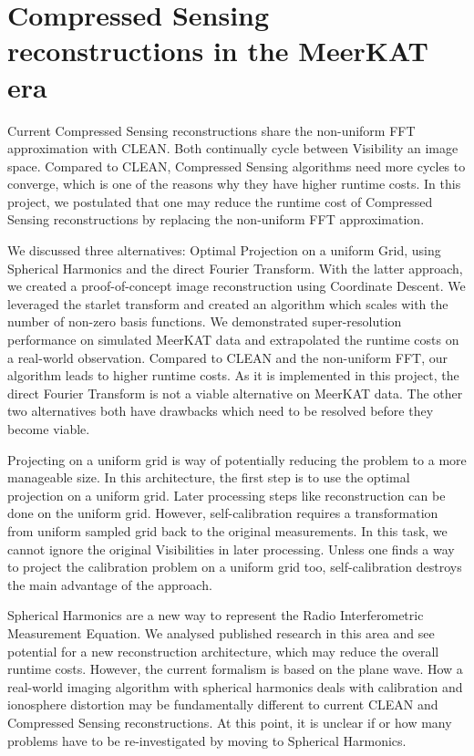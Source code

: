 \section{Compressed Sensing reconstructions in the MeerKAT era}
Current Compressed Sensing reconstructions share the non-uniform FFT approximation with CLEAN. Both continually cycle between Visibility an image space. Compared to CLEAN, Compressed Sensing algorithms need more cycles to converge, which is one of the reasons why they have higher runtime costs. In this project, we postulated that one may reduce the runtime cost of Compressed Sensing reconstructions by replacing the non-uniform FFT approximation. 

We discussed three alternatives: Optimal Projection on a uniform Grid, using Spherical Harmonics and the direct Fourier Transform. With the latter approach, we created a proof-of-concept image reconstruction using  Coordinate Descent. We leveraged the starlet transform and created an algorithm which scales with the number of non-zero basis functions. We demonstrated super-resolution performance on simulated MeerKAT data and extrapolated the runtime costs on a real-world observation. Compared to CLEAN and the non-uniform FFT, our algorithm leads to higher runtime costs. As it is implemented in this project, the direct Fourier Transform is not a viable alternative on MeerKAT data. The other two alternatives both have drawbacks which need to be resolved before they become viable.

Projecting on a uniform grid is way of potentially reducing the problem to a more manageable size. In this architecture, the first step is to use the optimal projection on a uniform grid. Later processing steps like reconstruction can be done on the uniform grid. However, self-calibration requires a transformation from uniform sampled grid back to the original measurements. In this task, we cannot ignore the original Visibilities in later processing. Unless one finds a way to project the calibration problem on a uniform grid too, self-calibration destroys the main advantage of the approach.

Spherical Harmonics are a new way to represent the Radio Interferometric Measurement Equation. We analysed published research in this area\cite{carozzi2015imaging, mcewen2008simulating} and see potential for a new reconstruction architecture, which may reduce the overall runtime costs. However, the current formalism\cite{smirnov2011revisiting} is based on the plane wave. How a real-world imaging algorithm with spherical harmonics deals with calibration and ionosphere distortion may be fundamentally different to current CLEAN and Compressed Sensing reconstructions. At this point, it is unclear if or how many problems have to be re-investigated by moving to Spherical Harmonics.



